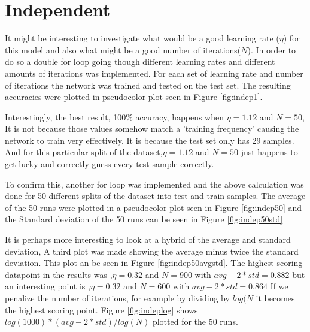\documentclass{article}
\begin{document}
\section*{Independent}
It might be interesting to investigate what would be a good learning rate (\(\eta\)) for this model and also what might be a good number of iterations(\(N\)). In order to do so a double for loop going though different learning rates and different amounts of iterations was implemented. For each set of learning rate and number of iterations the network was trained and tested on the test set. The resulting accuracies were plotted in pseudocolor plot seen in Figure \ref{fig:indep1}.

Interestingly, the best result, 100\% accuracy, happens when \(\eta=1.12\) and \(N=50\), It is not because those values somehow match a 'training frequency' causing the network to train very effectively. It is because the test set only has 29 samples. And for this particular split of the dataset,\(\eta=1.12\) and \(N=50\) just happens to get lucky and correctly guess every test sample correctly.

To confirm this, another for loop was implemented and the above calculation was done for 50 different splits of the dataset into test and train samples. The average of the 50 runs were plotted in a pseudocolor plot seen in Figure \ref{fig:indep50} and the Standard deviation of the 50 runs can be seen in Figure \ref{fig:indep50std}


It is perhaps more interesting to look at a hybrid of the average and standard deviation, A third plot was made showing the average minus twice the standard deviation. This plot an be seen in Figure \ref{fig:indep50avgstd}. The highest scoring datapoint in the results was ,\(\eta=0.32\) and \(N=900\) with \(avg - 2*std = 0.882\) but an interesting point is ,\(\eta=0.32\) and \(N=600\) with \(avg - 2*std = 0.864\) If we penalize the number of iterations, for example by dividing by \(log(N\) it becomes the highest scoring point. Figure \ref{fig:indeplog} shows \(log(1000)*(avg-2*std)/log(N)\) plotted for the 50 runs.
\\
\end{document}
